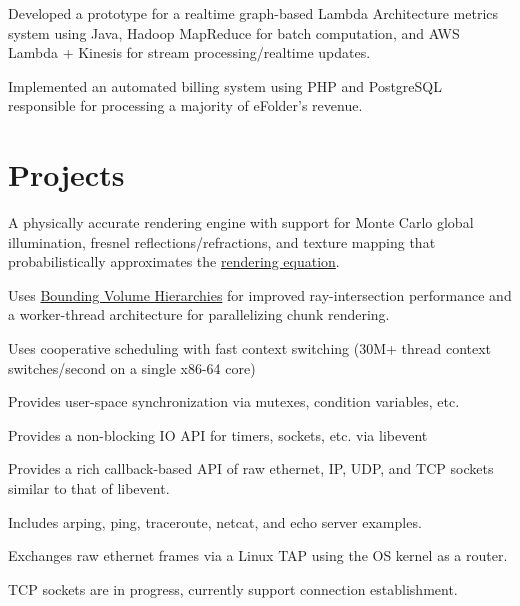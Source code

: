 \documentclass[]{resume}
\begin{document}
\begin{minipage}[t]{0.66\textwidth}
\begin{tightemize}
\item Developed a prototype for a realtime graph-based Lambda Architecture metrics system using Java, Hadoop MapReduce for batch computation, and AWS Lambda + Kinesis for stream processing/realtime updates.
\item Implemented an automated billing system using PHP and PostgreSQL responsible for processing a majority of eFolder's revenue.
\end{tightemize}
\sectionsep


\section{Projects}

\begin{tightemize}
\item A physically accurate rendering engine with support for Monte Carlo global illumination, fresnel reflections/refractions, and texture mapping that probabilistically approximates the
\href{https://en.wikipedia.org/wiki/Rendering_equation}{rendering equation}.
\item Uses \href{https://en.wikipedia.org/wiki/Bounding_volume_hierarchy}{Bounding Volume Hierarchies} for improved ray-intersection performance and a worker-thread architecture for parallelizing chunk rendering.
\end{tightemize}
\sectionsep

\begin{tightemize}
\item Uses cooperative scheduling with fast context switching (30M+ thread context switches/second on a single x86-64 core)
\item Provides user-space synchronization via mutexes, condition variables, etc.
\item Provides a non-blocking IO API for timers, sockets, etc. via libevent
\end{tightemize}
\sectionsep

\begin{tightemize}
\item Provides a rich callback-based API of raw ethernet, IP, UDP, and TCP sockets similar to that of libevent.
\item Includes arping, ping, traceroute, netcat, and echo server examples.
\item Exchanges raw ethernet frames via a Linux TAP using the OS kernel as a router.
\item TCP sockets are in progress, currently support connection establishment.
\end{tightemize}
\sectionsep

\end{minipage}
\end{document}
